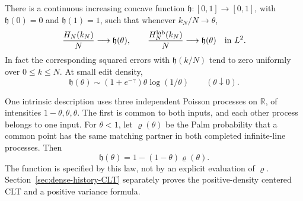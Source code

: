 \documentclass[11pt,letterpaper]{article}
\begin{document}
\begin{theorem}
\label{thm:dense-history-profile}
There is a continuous increasing concave function
$\mathfrak h:[0,1]\to[0,1]$, with $\mathfrak h(0)=0$ and
$\mathfrak h(1)=1$, such that whenever $k_N/N\to\theta$,
\begin{equation}\label{eq:dense-history-LLN}
 \frac{H_N(k_N)}N\longrightarrow\mathfrak h(\theta),\qquad
 \frac{H_N^{\rm lab}(k_N)}N\longrightarrow\mathfrak h(\theta)
                         \quad\hbox{in }L^2.
\end{equation}
In fact the corresponding squared errors with
$\mathfrak h(k/N)$ tend to zero uniformly over $0\le k\le N$.
At small edit density,
\begin{equation}\label{eq:dense-history-small-theta}
 \mathfrak h(\theta)\sim(1+e^{-\gamma})\theta\log(1/\theta)
                      \qquad(\theta\downarrow0).
\end{equation}

One intrinsic description uses three independent Poisson processes
on $\mathbb R$, of intensities $1-\theta,\theta,\theta$.
The first is common to both inputs, and each other process belongs
to one input. For $\theta<1$, let $\varrho(\theta)$ be the Palm
probability that a common point has the same matching partner in
both completed infinite-line processes. Then
\begin{equation}\label{eq:dense-history-palm}
 \mathfrak h(\theta)=1-(1-\theta)\varrho(\theta).
\end{equation}
The function is specified by this law, not by an explicit evaluation
of $\varrho$. Section~\ref{sec:dense-history-CLT} separately proves
the positive-density centered CLT and a positive variance formula.
\end{theorem}
\end{document}

